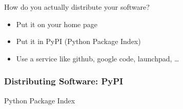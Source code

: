 \begin{frame}[fragile]
{}
How do you actually distribute your software?

\begin{itemize}
\item Put it on your home page
\item Put it in PyPI (Python Package Index)
\item Use a service like \alert{github}, \alert{google code}, \alert{launchpad}, \ldots
\end{itemize}
\end{frame}

\begin{frame}[fragile]
\frametitle{Distributing Software: PyPI}

Python Package Index

\end{frame}



